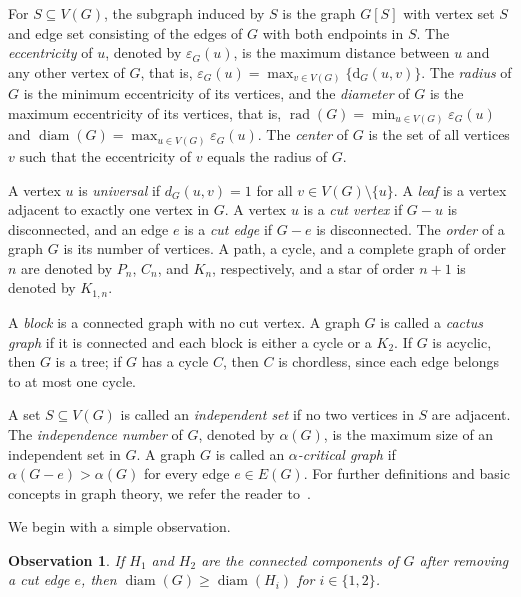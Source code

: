\documentclass[12pt]{article}
\newtheorem{observation}[theorem]{Observation}
\newcommand{\ie}{that is}
\begin{document}
For $S \subseteq V(G)$, the subgraph induced by $S$ is the graph $G[S]$ with vertex set $S$ and edge set consisting of the edges of $G$ with both endpoints in $S$. The \emph{eccentricity} of  \(u\), denoted by \(\varepsilon_G(u)\), 
is the maximum distance between \(u\) and any other vertex of \(G\), \ie,
$\varepsilon_G(u) = \max_{v \in V(G)} \{\mathrm{d}_G(u,v)\}.$
The \emph{radius} of $G$ is the minimum eccentricity of its vertices, and the \emph{diameter} of $G$ is the maximum eccentricity of its vertices, \ie,
$\operatorname{rad}(G) = \min_{u \in V(G)} \varepsilon_G(u)$ and $\operatorname{diam}(G) = \max_{u \in V(G)} \varepsilon_G(u).$ 
The \emph{center} of $G$ is the set of all vertices $v$ such that the eccentricity of $v$ equals the radius of $G$.

A vertex $u$ is \emph{universal} if $d_G(u,v) = 1$ for all $v \in V(G) \setminus \{u\}$. 
A \emph{leaf} is a vertex adjacent to exactly one vertex in $G$. 
A vertex $u$ is a \emph{cut vertex} if $G - u$ is disconnected, and an edge $e$ is a \emph{cut edge} if $G - e$ is disconnected. The \emph{order} of a graph $G$ is its number of vertices. A path, a cycle, and a complete graph of order $n$ are denoted by $P_n$, $C_n$, and $K_n$, respectively, and a star of order $n+1$ is denoted by $K_{1,n}$.

A \emph{block} is a connected graph with no cut vertex. 
A graph $G$ is called a \emph{cactus graph} if it is connected and each block is either a cycle or a $K_2$. 
If $G$ is acyclic, then $G$ is a tree; if $G$ has a cycle $C$, then $C$ is chordless, since each edge belongs to at most one cycle.

A set $S \subseteq V(G)$ is called an \emph{independent set} if no two vertices in $S$ are adjacent. The \emph{independence number} of $G$, denoted by $\alpha(G)$, is the maximum size of an independent set in $G$. 
A graph $G$ is called an \emph{$\alpha$-critical graph} if $\alpha(G - e) > \alpha(G)$ for every edge $e \in E(G)$. 
For further definitions and basic concepts in graph theory, we refer the reader to~\cite{west-1996}.

We begin with a simple observation. 

\begin{observation}\label{obsv1}
If $H_1$ and $H_2$ are the connected components of $G$ after removing a cut edge $e$, then $\operatorname{diam}(G) \geq \operatorname{diam}(H_i)$ for $i \in \{1, 2\}$.
\end{observation}

\end{document}
